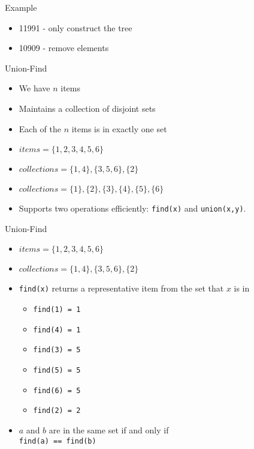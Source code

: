 \documentclass[12pt,t]{beamer}
\newcommand{\bi}{\begin{itemize}}
\newcommand{\ei}{\end{itemize}}
\begin{document}
\begin{frame}[fragile]{Example}

    \bi
      \item 11991 - only construct the tree
      \item 10909 - remove elements
    \ei
\end{frame}


\begin{frame}[fragile]{Union-Find}
    \vspace{20pt}
    \bi
        \item We have $n$ items
        \item Maintains a collection of disjoint sets
        \item Each of the $n$ items is in exactly one set
        \vspace{10pt}
        \item $items = \{1,2,3,4,5,6\}$
        \item $collections = \{1,4\}, \{3,5,6\}, \{2\}$
        \item $collections = \{1\}, \{2\}, \{3\}, \{4\}, \{5\}, \{6\}$
        \vspace{10pt}
        \item Supports two operations efficiently: \texttt{find(x)} and \texttt{union(x,y)}.
    \ei
\end{frame}

\begin{frame}{Union-Find}
    \bi
        \vspace{10pt}
        \item $items = \{1,2,3,4,5,6\}$
        \item $collections = \{1,4\}, \{3,5,6\}, \{2\}$
        \vspace{10pt}
        \item \texttt{find(x)} returns a representative item from the set that $x$ is in
            \bi
                \vspace{5pt}
                \item \texttt{find(1) = 1}
                \item \texttt{find(4) = 1}
                \vspace{5pt}
                \item \texttt{find(3) = 5}
                \item \texttt{find(5) = 5}
                \item \texttt{find(6) = 5}
                \vspace{5pt}
                \item \texttt{find(2) = 2}
            \ei
        \vspace{5pt}
        \item $a$ and $b$ are in the same set if and only if \\ \texttt{find(a) == find(b)}
    \ei
\end{frame}
\end{document}
